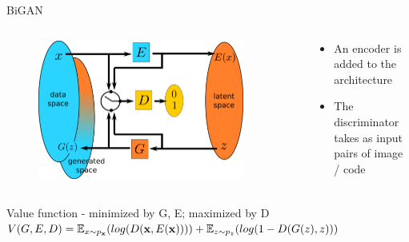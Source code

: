 \documentclass[xcolor=pdftex,dvipsnames,table,mathserif,aspectratio=169]{beamer}
\begin{document}
\begin{frame}{BiGAN}

\begin{columns}
  \begin{column}{.5\textwidth}
    \begin{figure}[ht]
    \centering
    \includegraphics[width=0.9\textwidth]{bigan}
  \end{figure}

  \end{column}

  \begin{column}{.5\textwidth}
  \begin{itemize}
  \item An encoder is added to the architecture
  \item The discriminator takes as input pairs of image / code
  \end{itemize}


  \end{column}
\end{columns}

  \begin{block}{Value function - minimized by G, E; maximized by D}
    $V(G, E, D) = \mathbb{E}_{x \sim p_{\mathbf{x}}}(log(D(\mathbf{x}, E(\mathbf{x})))) + \mathbb{E}_{z \sim p_z}(log(1 - D(G(z), z)))$
  \end{block}


\end{frame}
\end{document}
